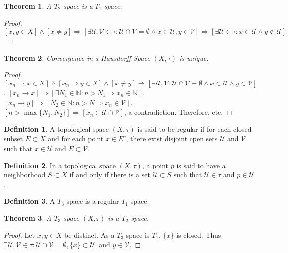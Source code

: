 \documentclass[oneside]{book}
\newtheorem{theorem}{Theorem}[section]
\theoremstyle{definition}
\newtheorem{definition}{Definition}[section]
\begin{document}
\begin{theorem}
A $T_2$ space is a $T_1$ space.
\end{theorem}
\begin{proof}
$[x,y\in X]\land [x\ne y]\Rightarrow [\exists \mathcal{U},\mathcal{V}\in \tau:\mathcal{U}\cap \mathcal{V}=\emptyset\land x\in \mathcal{U},y\in \mathcal{V}]\Rightarrow [\exists \mathcal{U}\in \tau:x\in \mathcal{U}\land y\notin \mathcal{U}]$
\end{proof}

\begin{theorem}
Convergence in a Hausdorff Space $(X,\tau)$ is unique.
\end{theorem}
\begin{proof}
$[x_n \rightarrow x\in X]\land [x_n \rightarrow y\in X]\land[x\ne y]\Rightarrow [\exists \mathcal{U},\mathcal{V}:\mathcal{U}\cap \mathcal{V}=\emptyset\land x\in \mathcal{U}\land y\in \mathcal{V}]$. $[x_n\rightarrow x]\Rightarrow [\exists N_1\in \mathbb{N}:n>N_1\Rightarrow x_n \in \mathbb{N}]$. $[x_n\rightarrow y]\Rightarrow [N_2\in \mathbb{N}:n>N\Rightarrow x_n \in \mathcal{V}]$. $[n>\max\{N_1,N_2\}]\Rightarrow [x_n \in \mathcal{U}\cap \mathcal{V}]$, a contradiction. Therefore, etc.
\end{proof}

\begin{definition}
A topological space $(X,\tau)$ is said to be regular if for each closed subset $E\subset X$ and for each point $x\in E^c$, there exist disjoint open sets $\mathcal{U}$ and $\mathcal{V}$ such that $x\in \mathcal{U}$ and $E\subset \mathcal{V}$.
\end{definition} 

\begin{definition}
In a topological space $(X,\tau)$, a point $p$ is said to have a neighborhood $S\subset X$ if and only if there is a set $\mathcal{U}\subset S$ such that $\mathcal{U}\in \tau$ and $p\in \mathcal{U}$.
\end{definition}

\begin{definition}
A $T_3$ space is a regular $T_1$ space.
\end{definition}

\begin{theorem}
A $T_3$ space $(X,\tau)$ is a $T_2$ space.
\end{theorem}
\begin{proof}
Let $x,y\in X$ be distinct. As a $T_3$ space is $T_1$, $\{x\}$ is closed. Thus $\exists \mathcal{U},\mathcal{V}\in\tau: \mathcal{U}\cap\mathcal{V}=\emptyset, \{x\}\subset \mathcal{U}$, and $y\in \mathcal{V}$.
\end{proof}
\end{document}
